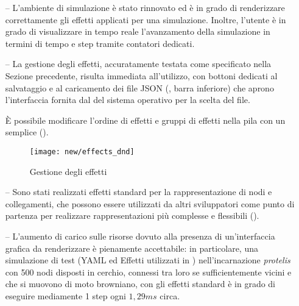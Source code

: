                 \begin{itemize}
                  \item[--]
                      L'ambiente di simulazione è stato rinnovato ed è in grado di renderizzare correttamente gli effetti applicati per una simulazione.
                      Inoltre, l'utente è in grado di visualizzare in tempo reale l'avanzamento della simulazione in termini di tempo e step tramite contatori dedicati.

                  \item[--]
                      La gestione degli effetti, accuratamente testata come specificato nella %
                      Sezione precedente, risulta immediata all'utilizzo, con bottoni dedicati al salvataggio e al caricamento dei file JSON (, barra inferiore) che aprono l'interfaccia fornita dal  del sistema operativo per la scelta del file.

                      È possibile modificare l'ordine di effetti e gruppi di effetti nella pila con un semplice  ().

                      \begin{figure}[htbp]
                          \centering
                          \texttt{[image: new/effects\_dnd]}
                          \caption{Gestione  degli effetti}
                          \label{fig:simWithDnD}
                      \end{figure}

                  \item[--]
                      Sono stati realizzati effetti standard per la rappresentazione di nodi e collegamenti, che possono essere utilizzati da altri sviluppatori come punto di partenza per realizzare rappresentazioni più complesse e flessibili ().

                  \item[--]
                      L'aumento di carico sulle risorse dovuto alla presenza di un'interfaccia grafica da renderizzare è pienamente accettabile:
                      in particolare, una simulazione di test (YAML ed Effetti utilizzati in ) nell'incarnazione \emph{protelis} con 500 nodi disposti in cerchio, connessi tra loro se sufficientemente vicini e che si muovono di moto browniano, con gli effetti standard è in grado di eseguire mediamente 1 step ogni $1,29ms$ circa.


\end{itemize}

